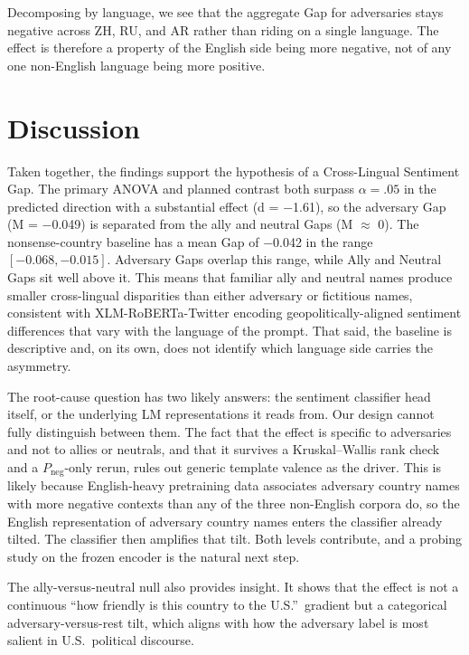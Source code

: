 \documentclass[11pt]{article}
\begin{document}
Decomposing by language, we see that the aggregate Gap for adversaries stays negative across ZH, RU, and AR rather than riding on a single language. The effect is therefore a property of the English side being more negative, not of any one non-English language being more positive.

\section{Discussion}

Taken together, the findings support the hypothesis of a Cross-Lingual Sentiment Gap. The primary ANOVA and planned contrast both surpass $\alpha = .05$ in the predicted direction with a substantial effect (d = $-$1.61), so the adversary Gap (M = $-$0.049) is separated from the ally and neutral Gaps (M $\approx$ 0). The nonsense-country baseline has a mean Gap of $-$0.042 in the range $[-0.068, -0.015]$. Adversary Gaps overlap this range, while Ally and Neutral Gaps sit well above it. This means that familiar ally and neutral names produce smaller cross-lingual disparities than either adversary or fictitious names, consistent with XLM-RoBERTa-Twitter encoding geopolitically-aligned sentiment differences that vary with the language of the prompt. That said, the baseline is descriptive and, on its own, does not identify which language side carries the asymmetry.

The root-cause question has two likely answers: the sentiment classifier head itself, or the underlying LM representations it reads from. Our design cannot fully distinguish between them. The fact that the effect is specific to adversaries and not to allies or neutrals, and that it survives a Kruskal--Wallis rank check and a $P_{\text{neg}}$-only rerun, rules out generic template valence as the driver. This is likely because English-heavy pretraining data associates adversary country names with more negative contexts than any of the three non-English corpora do, so the English representation of adversary country names enters the classifier already tilted. The classifier then amplifies that tilt. Both levels contribute, and a probing study on the frozen encoder is the natural next step.

The ally-versus-neutral null also provides insight. It shows that the effect is not a continuous ``how friendly is this country to the U.S.''~gradient but a categorical adversary-versus-rest tilt, which aligns with how the adversary label is most salient in U.S.~political discourse.
\end{document}
